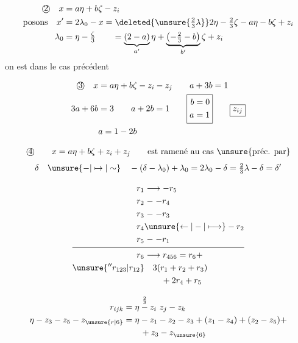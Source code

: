 {\[
\begin{aligned}
\text{\textcircled{2}}\quad x&=a\eta+b\zeta-z_i\\
\text{posons}\quad x'&=2\lambda_0-x=\deleted{\unsure{\tfrac23\lambda}}2\eta-\tfrac23\zeta-a\eta-b\zeta+z_i\\
\lambda_0&=\eta-\tfrac{\zeta}{3}\qquad
=\underbrace{(2-a)}_{a'}\eta+\underbrace{\left(-\tfrac23-b\right)}_{b'}\zeta+z_i
\end{aligned}
\]
on est dans le cas précédent

\[
\begin{aligned}
\text{\textcircled{3}}\quad x&=a\eta+b\zeta-z_i-z_j\qquad a+3b=1\\
3a+6b&=3\qquad a+2b=1\qquad
\boxed{\begin{aligned}b&=0\\a&=1\end{aligned}}\qquad\boxed{z_{ij}}\\
&a=1-2b
\end{aligned}
\]

\[
\text{\textcircled{4}}\qquad x=a\eta+b\zeta+z_i+z_j\qquad\text{est ramené au cas \unsure{préc. par}}
\]
\[
\delta\quad\unsure{-|\mapsto|\sim}\quad-(\delta-\lambda_0)+\lambda_0=2\lambda_0-\delta=\tfrac23\lambda-\delta=\delta'
\]

\[
\begin{aligned}
r_1&\longrightarrow-r_5\\r_2&\mathrel{-}-r_4\\r_3&\mathrel{-}-r_3\\
r_4&\unsure{\leftarrow|-|\longmapsto}-r_2\\r_5&\mathrel{-}-r_1\\ \noalign{\smallskip\hrule\smallskip}
r_6&\longrightarrow r_{456}=r_6+\\
\unsure{''r_{123}|r_{12}}&\quad 3(r_1+r_2+r_3)\\
&\qquad+2r_4+r_5
\end{aligned}
\]

\[
\begin{aligned}
r_{ijk}&=\eta\overset{\frac23}{-}z_i\ z_j-z_k\\
\eta-z_3-z_5-z_{\unsure{r|6}}&=\eta-z_1-z_2-z_3+
 (z_1-z_4)+(z_2-z_5)+\\
&\qquad +z_3-z_{\unsure{6}}
\end{aligned}
\]

}%

\deleted{%
\[
\begin{aligned}
\unsure{z|\zeta|\xi}'_i&=\deleted{\unsure{3\eta}}r_0+z_i\ \deleted{\unsure{=}}\\
\widetilde z'_i&=\widetilde r_0+\widetilde z_i=3r_0+\widetilde z_i\ \unsure{\Rightarrow}\quad \unsure{\zeta\longmapsto\lambda|\{1\longrightarrow\}\ \lambda|\{i\mapsto{}\}\ \lambda}\\
-\widetilde z'_i&=\unsure{-\widetilde z_i-\widetilde r_0=}
\end{aligned}
\]
}

